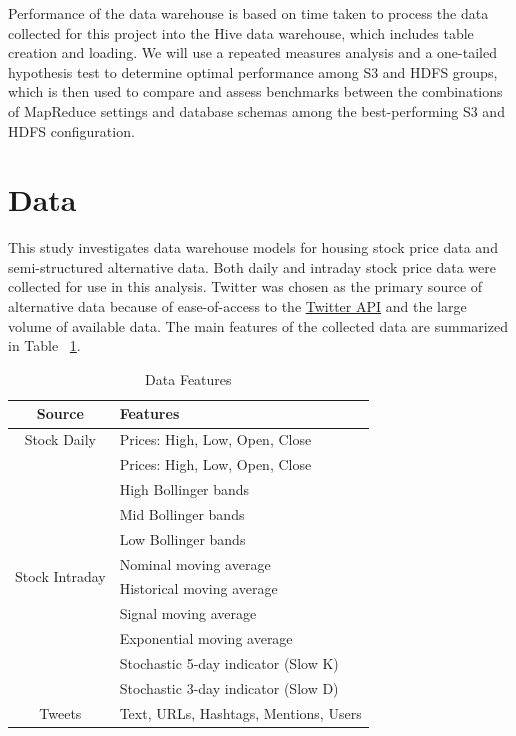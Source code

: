 \documentclass[journal]{IEEEtran}
\begin{document}
Performance of the data warehouse is based on time taken to process the data
 collected for this project into the Hive data warehouse,
 which includes table creation and loading. 
We will use a repeated measures analysis and a one-tailed hypothesis 
 test to determine optimal performance among S3 and HDFS groups, 
 which is then used to compare and assess benchmarks between the 
 combinations of MapReduce settings and database schemas among the
 best-performing S3 and HDFS configuration.

\section{Data}

This study investigates data warehouse models for housing stock
 price data and semi-structured alternative data. 
Both daily and intraday stock price data were collected
 for use in this analysis. 
Twitter was chosen as the primary source of alternative data because of
 ease-of-access to the \href{https://developer.twitter.com/en/docs}{Twitter API} 
 and the large volume of available data.
The main features of the collected data are summarized in Table ~\ref{DataFeatures}.

\begin{table}
	\renewcommand{\arraystretch}{1.3}
	\caption{Data Features}
	\label{DataFeatures}
	\centering
	\begin{tabular}{c|l}
		\hline
		Source       & Features\\
		\hline
		\hline
		Stock Daily  & Prices: High, Low, Open, Close\\
		\hline
		\multirow{10}{*}{Stock Intraday} &  Prices: High, Low, Open, Close \\
		&  High Bollinger bands\\
		&  Mid Bollinger bands\\
		&  Low Bollinger bands\\ 
		&  Nominal moving average\\
		&  Historical moving average\\
		&  Signal moving average\\ 
		&  Exponential moving average\\
		&  Stochastic 5-day indicator (Slow K)\\
		&  Stochastic 3-day indicator (Slow D)\\
		\hline
		Tweets       & Text, URLs, Hashtags, Mentions, Users\\
		\hline
	\end{tabular}
\end{table}
\end{document}
